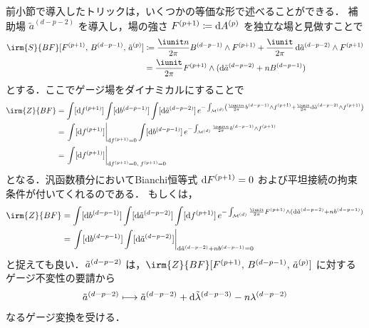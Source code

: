 \documentclass[TQFT_main]{subfiles}
\begin{document}
前小節で導入したトリックは，いくつかの等価な形で述べることができる．
補助場 $\tilde{a}^{(d-p-2)}$ を導入し，場の強さ $F^{(p+1)} \coloneqq  \dd{A^{(p)}}$ を独立な場と見做すことで
\begin{align}
    \label{eq:BF-1}
    \irm{S}{BF} [\hg{F}{p+1},\, \hg{B}{d-p-1},\, \hg{\tilde{a}}{p}] 
    &\coloneqq \frac{\iunit n}{2\pi} \hg{B}{d-p-1} \wedge \hg{F}{p+1} + \frac{\iunit}{2\pi} \dd{\hg{\tilde{a}}{d-p-2}} \wedge \hg{F}{p+1} \\
    &= \frac{\iunit}{2\pi} \hg{F}{p+1} \wedge (\dd{\hg{\tilde{a}}{d-p-2}} + n \hg{B}{d-p-1})
\end{align}
とする．ここでゲージ場をダイナミカルにすることで
\begin{align}
    \irm{Z}{BF}
    &= \int [\dd{\hg{f}{p+1}}] \int [\dd{\hg{b}{d-p-1}}] \int [\dd{\hg{\tilde{a}}{d-p-2}}]\, e^{-\int_{\mfdcal{M}{d}}\left(\frac{\iunit n}{2\pi} \hg{b}{d-p-1} \wedge \hg{f}{p+1} + \frac{\iunit}{2\pi} \dd{\hg{\tilde{a}}{d-p-2}} \wedge \hg{f}{p+1}\right)} \\
    &= \eval{\int [\dd{\hg{f}{p+1}}]}_{\dd{\hg{f}{p+1}} = 0} \int [\dd{\hg{b}{d-p-1}}]\, e^{-\int_{\mfdcal{M}{d}}\frac{\iunit n}{2\pi} \hg{b}{d-p-1} \wedge \hg{f}{p+1}} \\
    &= \eval{\int [\dd{\hg{f}{p+1}}]}_{\dd{\hg{f}{p+1}} = 0,\; \hg{f}{p+1} = 0}
\end{align}
となる．汎函数積分においてBianchi恒等式 $\dd{F^{(p+1)}} = 0$ および平坦接続の拘束条件が付いてくれるのである．
もしくは，
\begin{align}
    \irm{Z}{BF}
    &= \int [\dd{\hg{b}{d-p-1}}] \int [\dd{\hg{\tilde{a}}{d-p-2}}] \int [\dd{\hg{f}{p+1}}]\, e^{-\int_{\mfdcal{M}{d}} \frac{\iunit}{2\pi} \hg{F}{p+1} \wedge (\dd{\hg{\tilde{a}}{d-p-2}} + n \hg{b}{d-p-1})} \\
    &= \eval{\int [\dd{\hg{b}{d-p-1}}] \int [\dd{\hg{\tilde{a}}{d-p-2}}]}_{\dd{\hg{\tilde{a}}{d-p-2}} + n \hg{b}{d-p-1} = 0} \label{eq:BF-1-eom}
\end{align}
と捉えても良い．$\tilde{a}^{(d-p-2)}$ は，$\irm{Z}{BF} [\hg{F}{p+1},\, \hg{B}{d-p-1},\, \hg{\tilde{a}}{p}]$ に対するゲージ不変性の要請から
\begin{align}
    \label{eq:BF-1-gauge}
    \tilde{a}^{(d-p-2)} \longmapsto \tilde{a}^{(d-p-2)} + \dd{\tilde{\lambda}^{(d-p-3)}} - n \lambda^{(d-p-2)}
\end{align}
なるゲージ変換を受ける．
\end{document}
